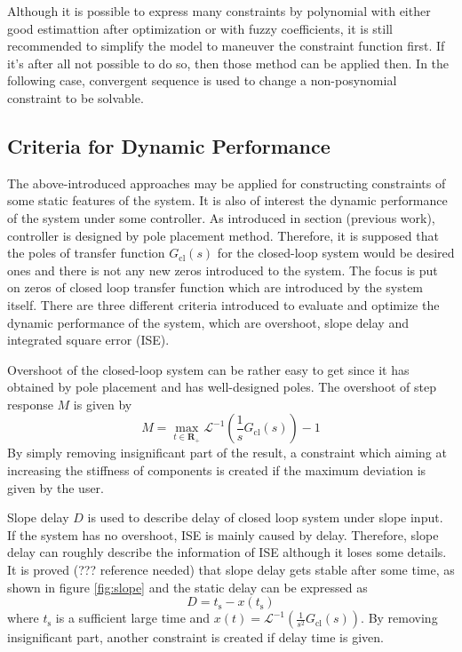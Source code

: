 Although it is possible to express many constraints by polynomial with either good estimattion after optimization or with fuzzy coefficients, it is still recommended to simplify the model to maneuver the constraint function first. If it's after all not possible to do so, then those method can be applied then. In the following case, convergent sequence is used to change a non-posynomial constraint to be solvable.

\subsection{Criteria for Dynamic Performance}
The above-introduced approaches may be applied for constructing constraints of some static features of the system. It is also of interest the dynamic performance of the system under some controller. As introduced in section (previous work), controller is designed by pole placement method. Therefore, it is supposed that the poles of transfer function $G_\text{cl}(s)$ for the closed-loop system would be desired ones and there is not any new zeros introduced to the system. The focus is put on zeros of closed loop transfer function which are introduced by the system itself. There are three different criteria introduced to evaluate and optimize the dynamic performance of the system, which are overshoot, slope delay and integrated square error (ISE).

Overshoot of the closed-loop system can be rather easy to get since it has obtained by pole placement and has well-designed poles. The overshoot of step response $M$ is given by $$M=\max_{t \in \mathbf{R_{+}}}\mathcal{L}^{-1}(\frac{1}{s}G_{\text{cl}}(s))-1$$ By simply removing insignificant part of the result, a constraint which aiming at increasing the stiffness of components is created if the maximum deviation is given by the user. 

Slope delay $D$ is used to describe delay of closed loop system under slope input. If the system has no overshoot, ISE is mainly caused by delay. Therefore, slope delay can roughly describe the information of ISE although it loses some details. It is proved (??? reference needed) that slope delay gets stable after some time, as shown in figure \ref{fig:slope} and the static delay can be expressed as $$D=t_\text{s}-x(t_\text{s})$$ where $t_\text{s}$ is a sufficient large time and $x(t)=\mathcal{L}^{-1}(\frac{1}{s^2}G_{\text{cl}}(s))$. By removing insignificant part, another constraint is created if delay time is given.

